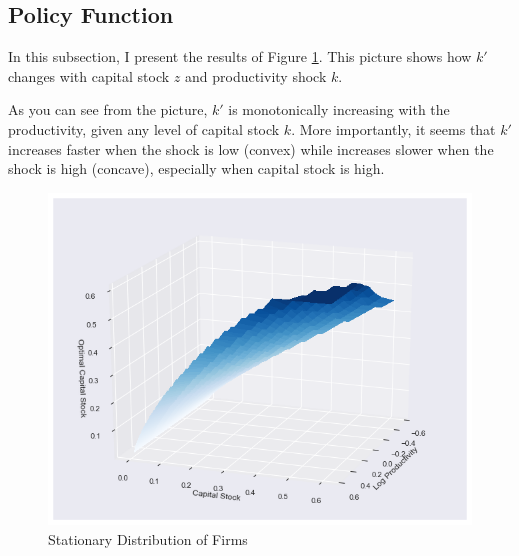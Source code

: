 \documentclass[letterpaper,12pt]{article}
\theoremstyle{definition}
\begin{document}
\subsection{Policy Function}

In this subsection, I present the results of Figure \ref{fig:figure_policy}. This picture shows how $ k' $ changes with capital stock $ z $ and productivity shock $ k $.

As you can see from the picture, $ k' $ is monotonically increasing with the productivity, given any level of capital stock $ k $. More importantly, it seems that $ k' $ increases faster when the shock is low (convex) while increases slower when the shock is high (concave), especially when capital stock is high.

\begin{figure}[h]
	\centering
	\includegraphics[width=\textwidth]{figure_policy}
	\caption{Stationary Distribution of Firms}
	\label{fig:figure_policy}
\end{figure}
\end{document}

